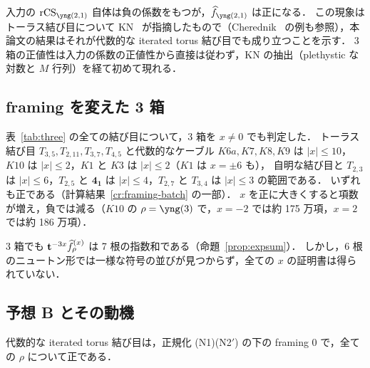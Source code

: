 \begin{remark}
入力の $\rCS_{\yng(2,1)}$ 自体は負の係数をもつが，$\hf_{\yng(2,1)}$ は正になる．
この現象はトーラス結び目について KN~\cite{Kameyama17} が指摘したもので（Cherednik~\cite{Cherednik11} の例も参照），本論文の結果はそれが代数的な iterated torus 結び目でも成り立つことを示す．
3 箱の正値性は入力の係数の正値性から直接は従わず，KN の抽出（plethystic な対数と $M$ 行列）を経て初めて現れる．
\end{remark}

\subsection{framing を変えた 3 箱}
\begin{compresult}\label{cr:three-x}
表~\ref{tab:three} の全ての結び目について，3 箱を $x\neq0$ でも判定した．
トーラス結び目 $T_{3,5},T_{2,11},T_{3,7},T_{4,5}$ と代数的なケーブル $K6a,K7,K8,K9$ は $|x|\le10$，$K10$ は $|x|\le2$，$K1$ と $K3$ は $|x|\le2$（$K1$ は $x=\pm6$ も），
自明な結び目と $T_{2,3}$ は $|x|\le6$，$T_{2,5}$ と $\mathbf{4_1}$ は $|x|\le4$，$T_{2,7}$ と $T_{3,4}$ は $|x|\le3$ の範囲である．
いずれも正である（計算結果~\ref{cr:framing-batch} の一部）．
$x$ を正に大きくすると項数が増え，負では減る（$K10$ の $\rho=\yng(3)$ で，$x=-2$ では約 175 万項，$x=2$ では約 186 万項）．
\end{compresult}
3 箱でも $\mathbf{t}^{-3x}\widehat{f}^{(x)}_\rho$ は 7 根の指数和である（命題~\ref{prop:expsum}）．
しかし，6 根のニュートン形では一様な符号の並びが見つからず，全ての $x$ の証明書は得られていない．

\subsection{予想 B とその動機}\label{sec:conjB}
\begin{tcolorbox}
\begin{conjecture}\label{conj:B}
代数的な iterated torus 結び目は，正規化 (N1)(N2$'$) の下の framing 0 で，全ての $\rho$ について正である．
\end{conjecture}
\end{tcolorbox}

